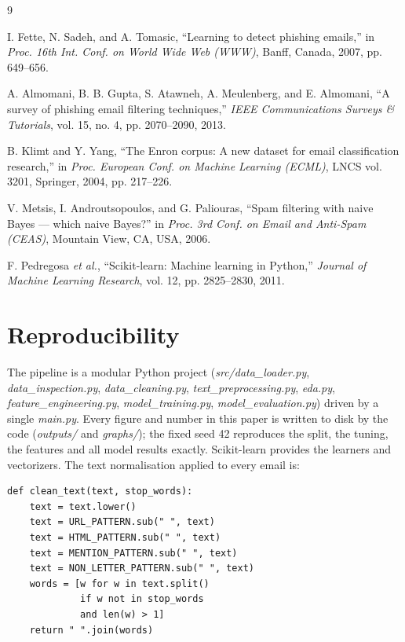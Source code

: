 \documentclass[conference]{IEEEtran}
\begin{document}
\begin{thebibliography}{9}

I. Fette, N. Sadeh, and A. Tomasic, ``Learning to detect phishing
emails,'' in \textit{Proc. 16th Int. Conf. on World Wide Web (WWW)},
Banff, Canada, 2007, pp. 649--656.

A. Almomani, B. B. Gupta, S. Atawneh, A. Meulenberg, and E. Almomani,
``A survey of phishing email filtering techniques,'' \textit{IEEE
Communications Surveys \& Tutorials}, vol. 15, no. 4, pp. 2070--2090,
2013.

B. Klimt and Y. Yang, ``The Enron corpus: A new dataset for email
classification research,'' in \textit{Proc. European Conf. on Machine
Learning (ECML)}, LNCS vol. 3201, Springer, 2004, pp. 217--226.

V. Metsis, I. Androutsopoulos, and G. Paliouras, ``Spam filtering with
naive Bayes --- which naive Bayes?'' in \textit{Proc. 3rd Conf. on Email
and Anti-Spam (CEAS)}, Mountain View, CA, USA, 2006.

F. Pedregosa \textit{et al.}, ``Scikit-learn: Machine learning in
Python,'' \textit{Journal of Machine Learning Research}, vol. 12, pp.
2825--2830, 2011.

\end{thebibliography}

\appendix
\section{Reproducibility}
The pipeline is a modular Python project
(\textit{src/data\_loader.py}, \textit{data\_inspection.py},
\textit{data\_cleaning.py}, \textit{text\_preprocessing.py},
\textit{eda.py}, \textit{feature\_engineering.py},
\textit{model\_training.py}, \textit{model\_evaluation.py}) driven by a
single \textit{main.py}. Every figure and number in this paper is
written to disk by the code (\textit{outputs/} and \textit{graphs/});
the fixed seed 42 reproduces the split, the tuning, the features and all
model results exactly. Scikit-learn \cite{pedregosa2011} provides the
learners and vectorizers. The text normalisation applied to every email
is:

\begin{verbatim}
def clean_text(text, stop_words):
    text = text.lower()
    text = URL_PATTERN.sub(" ", text)
    text = HTML_PATTERN.sub(" ", text)
    text = MENTION_PATTERN.sub(" ", text)
    text = NON_LETTER_PATTERN.sub(" ", text)
    words = [w for w in text.split()
             if w not in stop_words
             and len(w) > 1]
    return " ".join(words)
\end{verbatim}
\end{document}
